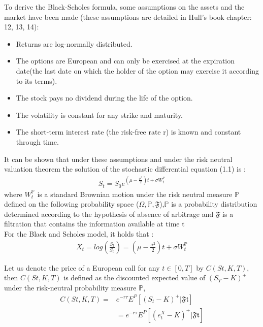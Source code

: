 \documentclass[12pt]{report}
\begin{document}
To derive the Black-Scholes formula, some assumptions on the assets and the market have been made (these assumptions are detailed in Hull's book chapter: 12, 13, 14):
\begin{itemize}
\item Returns are log-normally distributed.
\item The options are European and can only be exercised at the expiration date(the last date on which the holder of the option may exercise it according to its terms).
\item The stock pays no dividend during the life of the option.
\item The volatility is constant for any strike and maturity.
\item The short-term interest rate (the risk-free rate r) is known and constant through time.
\end{itemize} 


It can be shown that under these assumptions and under the risk neutral valuation theorem the solution of the stochastic differential equation (1.1) is :
\begin{gather}
S_t= S_0 e^{(\mu-\frac{\sigma^2}{2})t+\sigma W^{\mathbb{P}}_t}
\end{gather}
where $W_t^{\mathbb{P}}$ is a standard Brownian motion under the risk neutral measure $\mathbb{P}$  defined on the following probability space ($\Omega, \mathbb{P},\mathfrak{F}$),$\mathbb{P}$ is a probability distribution determined according to the hypothesis of absence of arbitrage and $\mathfrak{F}$ is a filtration that contains the information available at time t\\
For the Black and Scholes model, it holds that : 
\begin{gather}
X_t=log(\frac{S_t}{S_0})=(\mu-\frac{\sigma^2}{2})t+\sigma W^{\mathbb{P}}_t
\end{gather}

Let us denote the price of a European call for any $ t \in [0, T]$ by $C(St, K,T)$, then $C(St, K,T)$ is defined as the discounted expected value of $(S_T-K)^+$ under the risk-neutral probability measure $\mathbb{P}$,
\begin{align}
C(St, K,T)=& e^{-r \tau} E^P[(S_t-K)^+|\mathfrak{Ft}] \nonumber \\ 
&=e^{-r \tau} E^P[(e^X_t-K)^+|\mathfrak{Ft}] 
\end{align}
\end{document}
